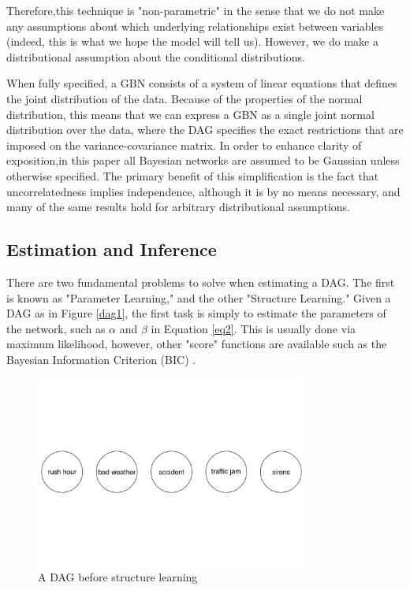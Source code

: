 \documentclass{article}
\begin{document}
Therefore,this technique is "non-parametric" in the sense that we do not make any assumptions about which underlying relationships exist between variables (indeed, this is what we hope the model will tell us). However, we do make a distributional assumption about the conditional distributions.

When fully specified, a GBN consists of a system of linear equations that defines the joint distribution of the data. Because of the properties of the normal distribution, this means that we can express a GBN as a single joint normal distribution over the data, where the DAG specifies the exact restrictions that are imposed on the variance-covariance matrix. In order to enhance clarity of exposition,in this paper all Bayesian networks are assumed to be Gaussian unless otherwise specified. The primary benefit of this simplification is the fact that uncorrelatedness implies independence, although it is by no means necessary, and many of the same results hold for arbitrary distributional assumptions.

\subsection{Estimation and Inference}

There are two fundamental problems to solve when estimating a DAG. The first is known as "Parameter Learning," and the other "Structure Learning." Given a DAG as in Figure \ref{dag1}, the first task is simply to estimate the parameters of the network, such as $\alpha$ and $\beta$ in Equation \ref{eq2}. This is usually done via maximum likelihood, however, other "score" functions are available such as the Bayesian Information Criterion (BIC) \parencite{chen1998speaker}.

\begin{figure}
  \centering
  \includegraphics[width=0.8\textwidth]{images/trafficjam_unfit.png}
  \caption{A DAG before structure learning}
  \label{dag2}
\end{figure}
\end{document}
